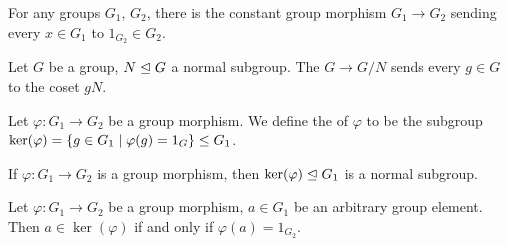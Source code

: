 \begin{definition}
For any groups $G_{1}$, $G_{2}$, there is the constant group morphism
$G_{1}\to G_{2}$ sending every $x\in G_{1}$ to
$1_{G_{2}}\in G_{2}$.
\end{definition}

\begin{definition}
Let $G$ be a group, $N\trianglelefteq G$ a normal subgroup.
The  $G\to G/N$ sends every $g\in G$ to the
coset $gN$.
\end{definition}

\begin{definition}
Let $\varphi\colon G_{1}\to G_{2}$ be a group morphism. We define the
 of $\varphi$ to be the subgroup
$\ker(\varphi)=\{g\in G_{1}\mid\varphi(g)=1_{G}\}\leq G_{1}$.
\end{definition}

\begin{theorem}
  If $\varphi\colon G_{1}\to G_{2}$ is a group morphism,
  then $\ker(\varphi)\trianglelefteq G_{1}$ is a normal subgroup.
\end{theorem}

\begin{theorem}
Let $\varphi\colon G_{1}\to G_{2}$ be a group morphism, $a\in G_{1}$ be
an arbitrary group element.
Then $a\in\ker(\varphi)$ if and only if $\varphi(a)=1_{G_{2}}$.
\end{theorem}
